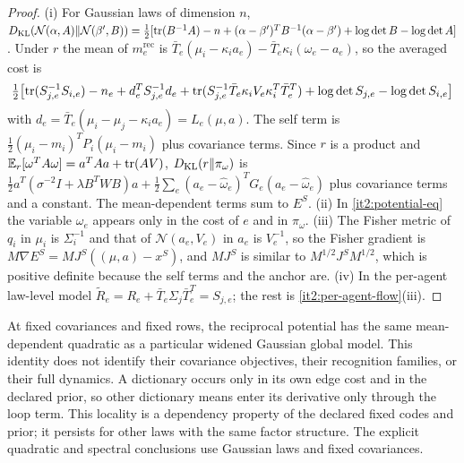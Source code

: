 \begin{proof}
(i) For Gaussian laws of dimension $n$, $D_{\mathrm{KL}}(\mathcal N(\alpha,A)\Vert\mathcal N(\beta',B))=\frac12[\operatorname{tr}(B^{-1}A)-n+(\alpha-\beta')^TB^{-1}(\alpha-\beta')+\log\det B-\log\det A]$. Under $r$ the mean of $m_e^{\mathrm{rec}}$ is $\bar T_e(\mu_i-\kappa_ia_e)-\bar T_e\kappa_i(\omega_e-a_e)$, so the averaged cost is
\begin{equation}
\tfrac12\bigl[\operatorname{tr}(S_{j,e}^{-1}S_{i,e})-n_e+d_e^TS_{j,e}^{-1}d_e+\operatorname{tr}(S_{j,e}^{-1}\bar T_e\kappa_iV_e\kappa_i^T\bar T_e^T)+\log\det S_{j,e}-\log\det S_{i,e}\bigr]
\end{equation}
with $d_e=\bar T_e(\mu_i-\mu_j-\kappa_ia_e)=L_e(\mu,a)$. The self term is $\frac12(\mu_i-m_i)^TP_i(\mu_i-m_i)$ plus covariance terms. Since $r$ is a product and $\mathbb E_r[\omega^TA\omega]=a^TAa+\operatorname{tr}(AV)$, $D_{\mathrm{KL}}(r\Vert\pi_\omega)$ is $\frac12a^T(\sigma^{-2}I+\lambda B^TWB)a+\frac12\sum_e(a_e-\hat\omega_e)^TG_e(a_e-\hat\omega_e)$ plus covariance terms and a constant. The mean-dependent terms sum to $E^S$. (ii) In \cref{it2:potential-eq} the variable $\omega_e$ appears only in the cost of $e$ and in $\pi_\omega$. (iii) The Fisher metric of $q_i$ in $\mu_i$ is $\Sigma_i^{-1}$ and that of $\mathcal N(a_e,V_e)$ in $a_e$ is $V_e^{-1}$, so the Fisher gradient is $M\nabla E^S=MJ^S((\mu,a)-x^S)$, and $MJ^S$ is similar to $M^{1/2}J^SM^{1/2}$, which is positive definite because the self terms and the anchor are. (iv) In the per-agent law-level model $\tilde R_e=R_e+\bar T_e\Sigma_j\bar T_e^T=S_{j,e}$; the rest is \cref{it2:per-agent-flow}(iii).
\end{proof}

At fixed covariances and fixed rows, the reciprocal potential has the same mean-dependent quadratic as a particular widened Gaussian global model. This identity does not identify their covariance objectives, their recognition families, or their full dynamics. A dictionary occurs only in its own edge cost and in the declared prior, so other dictionary means enter its derivative only through the loop term. This locality is a dependency property of the declared fixed codes and prior; it persists for other laws with the same factor structure. The explicit quadratic and spectral conclusions use Gaussian laws and fixed covariances.

